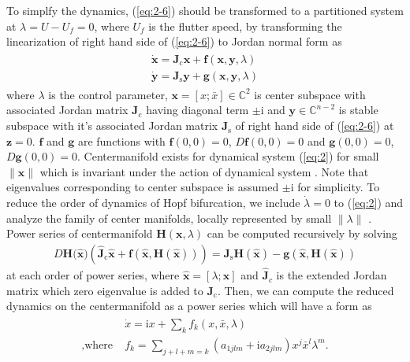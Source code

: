 \documentclass[openacc]{rsproca_new}%
\theoremstyle{own}
\def\complex{\mathbb{C}}
\def\vec#1{\ensuremath{\mathbf{#1}}}
\newcommand{\Eref}[1]{(\ref{#1})}
\begin{document}
To simplfy the dynamics, \Eref{eq:2-6} should be transformed to a partitioned system at \(\lambda= U - U_f =0\), where $U_f$ is the flutter speed, by transforming the linearization of right hand side of \Eref{eq:2-6} to Jordan normal form as
\begin{align}\label{eq:2}
  \begin{split}
    \dot{\vec{x}} =\vec{J}_\textrm{c} \vec{x} + \vec{f}(\vec{x},\vec{y},\lambda)\\
    \dot{\vec{y}} =\vec{J}_\textrm{s} \vec{y} +\vec{g}(\vec{x},\vec{y},\lambda)
  \end{split}
\end{align}
where $\lambda $ is the control parameter, $\vec{x}=[x;\bar{x}]\in \complex^2$ is center subspace with associated Jordan matrix $\vec{J}_\textrm{c}$ having diagonal term $\pm\textrm{i}$ and $\vec{y}\in \complex^{n-2}$ is stable subspace with it's associated Jordan matrix $\vec{J}_\textrm{s}$ of right hand side of \Eref{eq:2-6} at $\vec{z}=0$.
$\vec{f}$ and $\vec{g}$ are functions with $\vec{f}(0,0)=0$, $D\vec{f}(0,0)=0$ and $\vec{g}(0,0)=0$, $D\vec{g}(0,0)=0$. Centermanifold exists for dynamical system \Eref{eq:2} for small  $\|\vec{x}\|$ which is invariant under the action of dynamical system \cite{carr2012applications}. Note that eigenvalues corresponding to center subspace is assumed $\pm\textrm{i}$ for simplicity. To reduce the order of dynamics of Hopf bifurcation, we include $\dot\lambda=0$ to \Eref{eq:2} and analyze the family of center manifolds, locally represented by small $\|\lambda\|$  \cite{kuznetsov2013elements}. Power series of centermanifold $\vec{H}(\vec{x},\lambda)$ can be computed recursively by solving
\begin{align}\label{eq:3}
    D\vec{H}({\vec{\hat{x})}}(\vec{\hat{J}}_\textrm{c}\vec{\hat{x}}+\vec{f}(\vec{\hat{x}},\vec{H}(\vec{\hat{x}}))) =\vec{J}_\textrm{s} \vec{H}(\vec{\hat{x}})-\vec{g}(\vec{\hat{x}},\vec{H}(\vec{\hat {x}}))
\end{align}
at each order of power series, where \(\vec{\hat{x}}=[\lambda;\vec{x}]\) and \(\vec{\hat{J}}_c\) is the extended Jordan matrix which zero eigenvalue is added to \(\vec{J}_\textrm{c}\). Then, we can compute the reduced dynamics on the centermanifold as a power series which will have a form as
\begin{align}\label{eq:4}
  \begin{split}
    {}&\dot{x} =\textrm{i} x+\sum_k f_k(x,\bar{x},\lambda)\\
    ,\textrm{where} \; & f_k=\sum_{j+l+m=k}({a}_{1jlm}+\textrm{i}{a}_{2jlm})x^j\bar{x}^l\lambda^m.
  \end{split}
\end{align}
\end{document}
